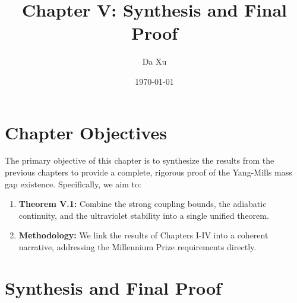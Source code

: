 \documentclass[11pt,a4paper]{report}
\title{Chapter V: Synthesis and Final Proof}
\author{Da Xu}
\date{\today}
\begin{document}
\maketitle

\chapter*{Chapter Objectives}
The primary objective of this chapter is to synthesize the results from the previous chapters to provide a complete, rigorous proof of the Yang-Mills mass gap existence. Specifically, we aim to:
\begin{enumerate}
    \item \textbf{Theorem V.1:} Combine the strong coupling bounds, the adiabatic continuity, and the ultraviolet stability into a single unified theorem.
    \item \textbf{Methodology:} We link the results of Chapters I-IV into a coherent narrative, addressing the Millennium Prize requirements directly.
\end{enumerate}

\tableofcontents
\clearpage
{}

\chapter{Synthesis and Final Proof}
\label{ch:synthesis_final_proof}













\printbibliography[heading=subbibliography, title={References for Chapter 5}]
\end{document}

